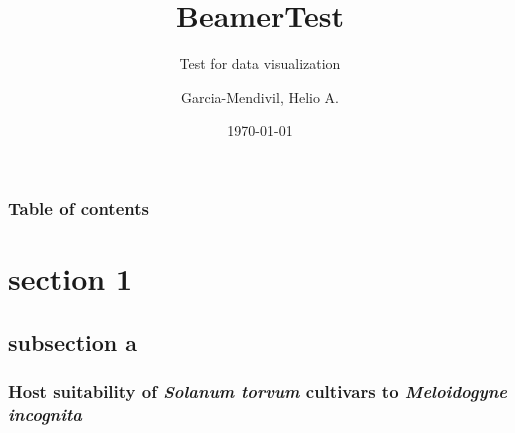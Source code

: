 \documentclass{beamer}\usepackage[]{graphicx}\usepackage[]{color}
\title{BeamerTest}
\subtitle{Test for data visualization}
\institute{UPC}
\date{\today}
\author{Garcia-Mendivil, Helio A.}
\begin{document}
\begin{frame}
\titlepage
\end{frame}

\begin{frame}
\label{contents}

\frametitle{Table of contents}
\tableofcontents

\end{frame}

\section{section 1}
\subsection{subsection a}

\begin{frame}

\frametitle{Host suitability of \textit{Solanum torvum} cultivars to \textit{Meloidogyne incognita}}
\end{frame}
\end{document}
